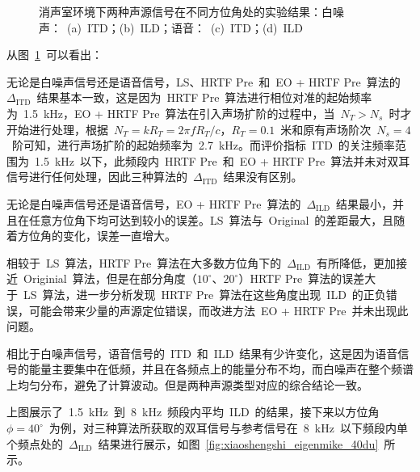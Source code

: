 \begin{figure}[H]
\centering
{}
\hfill
{}
\vfill
{}
\hfill
{}
\caption{消声室环境下两种声源信号在不同方位角处的实验结果：白噪声：~(a)~ITD；(b)~ILD；语音：~(c)~ITD；(d)~ILD}
\label{fig.xiaoshengshi_eigenmike_phiChange_whitenoise}
\end{figure}


从图~\ref{fig.xiaoshengshi_eigenmike_phiChange_whitenoise}~可以看出：
\begin{inparaenum}[（1）]

\item 无论是白噪声信号还是语音信号，LS、HRTF Pre~和~EO + HRTF Pre~算法的~$\Delta_{\text{ITD}}$~结果基本一致，这是因为~HRTF Pre~算法进行相位对准的起始频率为~1.5~kHz，EO + HRTF Pre~算法在引入声场扩阶的过程中，当~$N_{T}>N_{s}$~时才开始进行处理，根据~$N_{T} =k R_{T}=2\pi f R_{T}/c$，$R_{T}=0.1$~米和原有声场阶次~$N_{s}=4$~阶可知，进行声场扩阶的起始频率为~2.7~kHz。而评价指标~ITD~的关注频率范围为~1.5~kHz~以下，此频段内~HRTF Pre~和~EO + HRTF Pre~算法并未对双耳信号进行任何处理，因此三种算法的~$\Delta_{\text{ITD}}$~结果没有区别。

\item 无论是白噪声信号还是语音信号，EO + HRTF Pre~算法的~$\Delta_{\text{ILD}}$~结果最小，并且在任意方位角下均可达到较小的误差。LS~算法与~Original~的差距最大，且随着方位角的变化，误差一直增大。

\item 相较于~LS~算法，HRTF Pre~算法在大多数方位角下的~$\Delta_{\text{ILD}}$~有所降低，更加接近~Originial~算法，但是在部分角度（$10^{\circ}$、$20^{\circ}$）HRTF Pre~算法的误差大于~LS~算法，进一步分析发现~HRTF Pre~算法在这些角度出现~ILD~的正负错误，可能会带来少量的声源定位错误，而改进方法~EO + HRTF Pre~并未出现此问题。

\item 相比于白噪声信号，语音信号的~ITD~和~ILD~结果有少许变化，这是因为语音信号的能量主要集中在低频，并且在各频点上的能量分布不均，而白噪声在整个频谱上均匀分布，避免了计算波动。但是两种声源类型对应的综合结论一致。

\end{inparaenum}

上图展示了~1.5~kHz~到~8~kHz~频段内平均~ILD~的结果，接下来以方位角~$\phi=40^{\circ}$~为例，对三种算法所获取的双耳信号与参考信号在~8~kHz~以下频段内单个频点处的~$\Delta_{\text{ILD}}$~结果进行展示，如图~\ref{fig:xiaoshengshi_eigenmike_40du}~所示。


